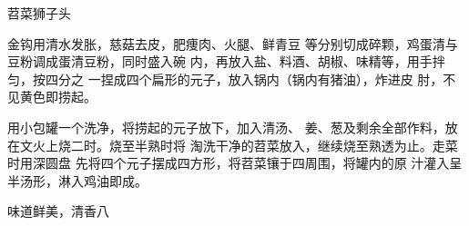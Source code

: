 \begin{recipe}{苕菜狮子头}

\ingredients



\cooking

\step 金钩用清水发胀，慈菇去皮，肥痩肉、火腿、鲜青豆 等分别切成碎颗，鸡蛋清与豆粉调成蛋清豆粉，同时盛入碗 内，再放入盐、料酒、胡椒、味精等，用手拌匀，按四分之 一捏成四个扁形的元子，放入锅内（锅内有猪油），炸进皮 肘，不见黄色即捞起。

\step 用小包罐一个洗净，将捞起的元子放下，加入清汤、 姜、葱及剩余全部作料，放在文火上烧二时。烧至半熟时将 淘洗干净的苕菜放入，继续烧至熟透为止。走菜时用深圆盘 先将四个元子摆成四方形，将苕菜镶于四周围，将罐内的原 汁灌入呈半汤形，淋入鸡油即成。

\notes

味道鲜美，清香八

\end{recipe}

